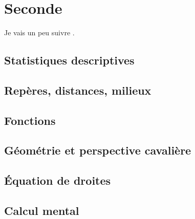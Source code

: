 




\makeindex
\makenomenclature







\newpage



\tableofcontents

\newpage

\part{Seconde}

Je vais un peu suivre \cite{oklaEg}.

\chapter{Statistiques descriptives}




\chapter{Repères, distances, milieux}


\chapter{Fonctions}


\chapter{Géométrie et perspective cavalière}


\chapter{Équation de droites}


\chapter{Calcul mental}


